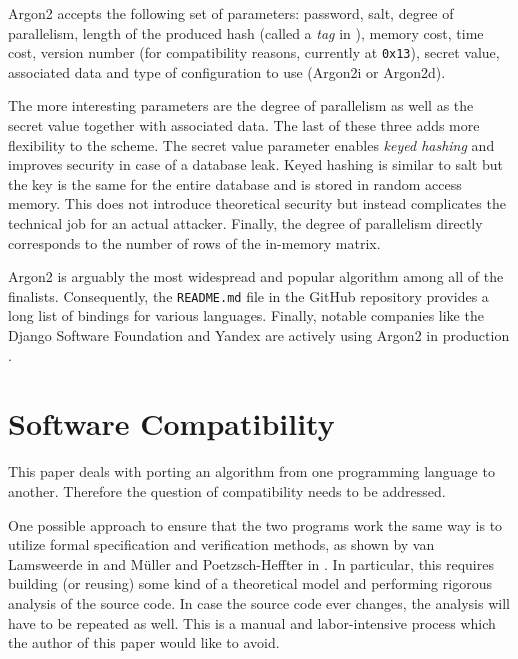 Argon2 accepts the following set of parameters: password, salt, degree of parallelism, length of the produced hash (called a \emph{tag} in \cite{biryukov:2015:argon2}), memory cost, time cost, version number (for compatibility reasons, currently at \texttt{0x13}), secret value, associated data and type of configuration to use (Argon2i or Argon2d).

The more interesting parameters are the degree of parallelism as well as the secret value together with associated data. The last of these three adds more flexibility to the scheme. The secret value parameter enables \emph{keyed hashing} \cite{223865} and improves security in case of a database leak. Keyed hashing is similar to salt but the key is the same for the entire database and is stored in random access memory. This does not introduce theoretical security but instead complicates the technical job for an actual attacker. Finally, the degree of parallelism directly corresponds to the number of rows of the in-memory matrix.

Argon2 is arguably the most widespread and popular algorithm among all of the finalists. Consequently, the \texttt{README.md} file in the GitHub repository \cite{github:2017:argon2} provides a long list of bindings for various languages. Finally, notable companies like the Django Software Foundation and Yandex are actively using Argon2 in production \cite{django:2017:argon2, github:2017:argonische}.

\section{Software Compatibility}
\label{sec:software-compatibility}

This paper deals with porting an algorithm from one programming language to another. Therefore the question of compatibility needs to be addressed.

One possible approach to ensure that the two programs work the same way is to utilize formal specification and verification methods, as shown by van Lamsweerde in \cite{lamsweerde:2000:formal-specification} and Müller and Poetzsch-Heffter in \cite{mueller:1994:formal-specification}. In particular, this requires building (or reusing) some kind of a theoretical model and performing rigorous analysis of the source code. In case the source code ever changes, the analysis will have to be repeated as well. This is a manual and labor-intensive process which the author of this paper would like to avoid.

